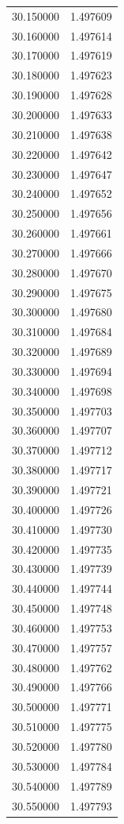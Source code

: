 \begin{tabular}{rr}
30.150000 & 1.497609 \\
30.160000 & 1.497614 \\
30.170000 & 1.497619 \\
30.180000 & 1.497623 \\
30.190000 & 1.497628 \\
30.200000 & 1.497633 \\
30.210000 & 1.497638 \\
30.220000 & 1.497642 \\
30.230000 & 1.497647 \\
30.240000 & 1.497652 \\
30.250000 & 1.497656 \\
30.260000 & 1.497661 \\
30.270000 & 1.497666 \\
30.280000 & 1.497670 \\
30.290000 & 1.497675 \\
30.300000 & 1.497680 \\
30.310000 & 1.497684 \\
30.320000 & 1.497689 \\
30.330000 & 1.497694 \\
30.340000 & 1.497698 \\
30.350000 & 1.497703 \\
30.360000 & 1.497707 \\
30.370000 & 1.497712 \\
30.380000 & 1.497717 \\
30.390000 & 1.497721 \\
30.400000 & 1.497726 \\
30.410000 & 1.497730 \\
30.420000 & 1.497735 \\
30.430000 & 1.497739 \\
30.440000 & 1.497744 \\
30.450000 & 1.497748 \\
30.460000 & 1.497753 \\
30.470000 & 1.497757 \\
30.480000 & 1.497762 \\
30.490000 & 1.497766 \\
30.500000 & 1.497771 \\
30.510000 & 1.497775 \\
30.520000 & 1.497780 \\
30.530000 & 1.497784 \\
30.540000 & 1.497789 \\
30.550000 & 1.497793 \\

\end{tabular}
